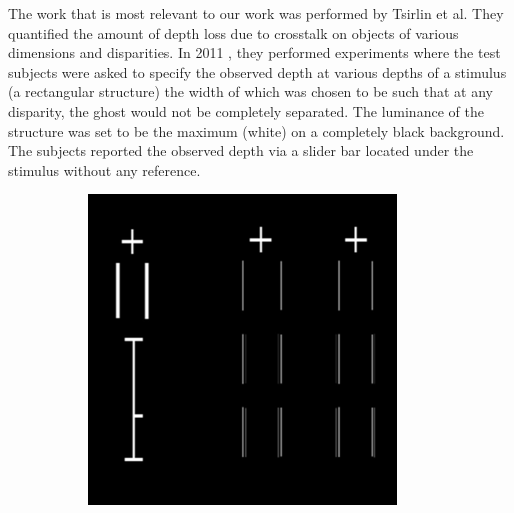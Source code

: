 The work that is most relevant to our work was performed by Tsirlin et al. They quantified the amount of depth loss due to crosstalk on objects of various dimensions and disparities. In 2011 \cite{tsirlin2011effect}, they performed experiments where the test subjects were asked to specify the observed depth at various depths of a stimulus (a rectangular structure) the width of which was chosen to be such that at any disparity, the ghost would not be completely separated. The luminance of the structure was set to be the maximum (white) on a completely black background. The subjects reported the observed depth via a slider bar located under the stimulus without any reference.
\begin{figure}[htbp]
    \begin{subfigure}[b]{0.5\textwidth}
        \includegraphics[width=\textwidth]{./Template_Figures/Tsirlin_exp}
        \caption{}\label{fig:tsirlin_exp}
    \end{subfigure}
    \begin{subfigure}[b]{0.5\textwidth}

\end{subfigure}
\end{figure}
